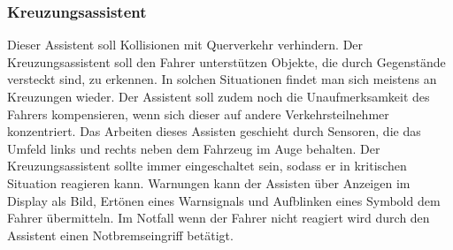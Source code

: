         \subsubsection{Kreuzungsassistent}
        Dieser Assistent soll Kollisionen mit Querverkehr verhindern. Der Kreuzungsassistent soll den Fahrer 
        unterstützen Objekte, die durch Gegenstände versteckt sind, zu erkennen. In solchen Situationen findet 
        man sich meistens an Kreuzungen wieder. Der Assistent soll zudem noch die Unaufmerksamkeit des 
        Fahrers kompensieren, wenn sich dieser auf andere Verkehrsteilnehmer konzentriert. Das Arbeiten  
        dieses Assisten geschieht durch Sensoren, die das Umfeld links und rechts neben dem Fahrzeug  im 
        Auge behalten. Der Kreuzungsassistent sollte immer eingeschaltet sein, sodass er in kritischen Situation 
        reagieren kann. Warnungen kann der Assisten über Anzeigen im Display als Bild, Ertönen eines Warnsignals
        und Aufblinken eines Symbold dem Fahrer übermitteln. Im Notfall wenn der Fahrer nicht 
        reagiert wird durch den Assistent einen Notbremseingriff betätigt.
        ~\cite{kreuzungsassi.PB1} ~\cite{kreuzungsassi.PB2}
